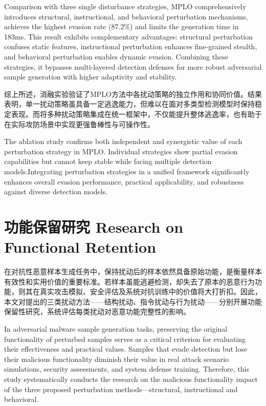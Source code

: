 Comparison with three single disturbance strategies, MPLO comprehensively introduces structural, instructional, and behavioral perturbation mechanisms, achieves the highest evasion rate (87.2\%) and limits the generation time in 183ms. This result exhibits complementary advantages: structural perturbation confuses static features, instructional perturbation enhances fine-grained stealth, and behavioral perturbation enables dynamic evasion. Combining these strategies, it bypasses multi-layered detection defenses for more robust adversarial sample generation with higher adaptivity and stability.

综上所述，消融实验验证了MPLO方法中各扰动策略的独立作用和协同价值。结果表明，单一扰动策略虽具备一定逃逸能力，但难以在面对多类型检测模型时保持稳定表现。而将多种扰动策略集成在统一框架中，不仅能提升整体逃逸率，也有助于在实际攻防场景中实现更强鲁棒性与可操作性。

The ablation study confirms both independent and synergistic value of each perturbation strategy in MPLO. Individual strategies show partial evasion capabilities but cannot keep stable while facing multiple detection models.Integrating perturbation strategies in a unified framework significantly enhances overall evasion performance, practical applicability, and robustness against diverse detection models.  

\section{功能保留研究 Research on Functional Retention}

在对抗性恶意样本生成任务中，保持扰动后的样本依然具备原始功能，是衡量样本有效性和实用价值的重要标准。若样本虽能逃避检测，却失去了原本的恶意行为功能，则其在真实攻击模拟、安全评估及系统对抗训练中的价值将大打折扣。因此，本文对提出的三类扰动方法——结构扰动、指令扰动与行为扰动——分别开展功能保留性研究，系统评估每类扰动对恶意功能完整性的影响。

In adversarial malware sample generation tasks, preserving the original functionality of perturbed samples serves as a critical criterion for evaluating their effectiveness and practical values. Samples that evade detection but lose their malicious functionality diminish their value in real attack scenario simulations, security assessments, and system defense training. Therefore, this study systematically conducts the research on the malicious functionality impact of the three proposed perturbation methods—structural, instructional and behavioral.

